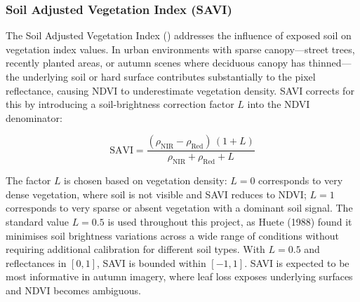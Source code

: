 \subsubsection*{Soil Adjusted Vegetation Index (SAVI)}

The Soil Adjusted Vegetation Index (\cite{huete1988}) addresses the influence of exposed
soil on vegetation index values. In urban environments with sparse canopy---street trees, recently planted areas, or autumn scenes where deciduous canopy has thinned---the underlying soil or hard surface contributes substantially to the pixel reflectance, causing NDVI to underestimate vegetation density. SAVI corrects for this by introducing a soil-brightness correction factor $L$ into the NDVI denominator:

\begin{equation}
    \text{SAVI} = \frac{(\rho_{\text{NIR}} - \rho_{\text{Red}})\,(1 + L)}
                       {\rho_{\text{NIR}} + \rho_{\text{Red}} + L}
    \label{eq:savi}
\end{equation}

The factor $L$ is chosen based on vegetation density: $L = 0$ corresponds to very dense vegetation, where soil is not visible and SAVI reduces to NDVI; $L = 1$ corresponds to very sparse or absent vegetation with a dominant soil signal. The standard value $L = 0.5$ is used throughout this project, as Huete (1988) found it minimises soil brightness variations across a wide range of conditions without requiring additional calibration for different soil types. With $L = 0.5$ and reflectances in $[0, 1]$, SAVI is bounded within $[-1, 1]$. SAVI is expected to be most informative in autumn imagery, where leaf loss exposes underlying surfaces and NDVI becomes ambiguous.

